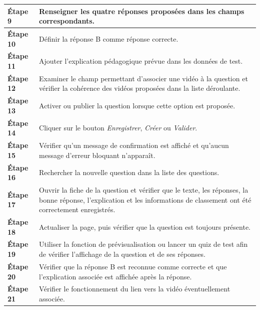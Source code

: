 \begin{longtable}{
    |>{\raggedright\arraybackslash}p{}
    |>{\raggedright\arraybackslash}p{}|
}
\textbf{Étape 9}
&
Renseigner les quatre réponses proposées dans les champs correspondants.
\\
\hline

\textbf{Étape 10}
&
Définir la réponse B comme réponse correcte.
\\
\hline

\textbf{Étape 11}
&
Ajouter l'explication pédagogique prévue dans les données de test.
\\
\hline

\textbf{Étape 12}
&
Examiner le champ permettant d'associer une vidéo à la question et vérifier
la cohérence des vidéos proposées dans la liste déroulante.
\\
\hline

\textbf{Étape 13}
&
Activer ou publier la question lorsque cette option est proposée.
\\
\hline

\textbf{Étape 14}
&
Cliquer sur le bouton \textit{Enregistrer}, \textit{Créer} ou
\textit{Valider}.
\\
\hline

\textbf{Étape 15}
&
Vérifier qu'un message de confirmation est affiché et qu'aucun message
d'erreur bloquant n'apparaît.
\\
\hline

\textbf{Étape 16}
&
Rechercher la nouvelle question dans la liste des questions.
\\
\hline

\textbf{Étape 17}
&
Ouvrir la fiche de la question et vérifier que le texte, les réponses,
la bonne réponse, l'explication et les informations de classement ont été
correctement enregistrés.
\\
\hline

\textbf{Étape 18}
&
Actualiser la page, puis vérifier que la question est toujours présente.
\\
\hline

\textbf{Étape 19}
&
Utiliser la fonction de prévisualisation ou lancer un quiz de test afin de
vérifier l'affichage de la question et de ses réponses.
\\
\hline

\textbf{Étape 20}
&
Vérifier que la réponse B est reconnue comme correcte et que l'explication
associée est affichée après la réponse.
\\
\hline

\textbf{Étape 21}
&
Vérifier le fonctionnement du lien vers la vidéo éventuellement associée.
\\
\hline


\end{longtable}
